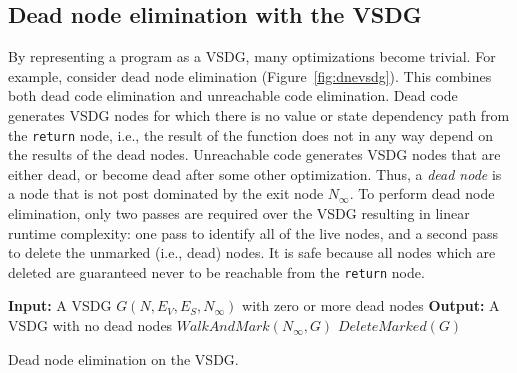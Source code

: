{\subsection{Dead node elimination with the VSDG}
By representing a program as a VSDG, many optimizations become trivial. 
For example, consider dead node elimination (Figure~\ref{fig:dnevsdg}). 
This combines both dead code elimination and unreachable code elimination. 
Dead code generates VSDG nodes for which there is no value or state dependency path from the \texttt{return} node, i.e., the result of the function does not in any way depend on the results of the dead nodes. 
Unreachable code generates VSDG nodes that are either dead, or become dead after some other optimization. 
Thus, a \textit{dead node} is a node that is not post dominated by the exit node $N_{\infty}$. 
To perform dead node elimination, only two passes are required over the VSDG resulting in linear runtime complexity: 
one pass to identify all of the live nodes, and a second pass to delete the unmarked (i.e., dead) nodes. 
It is safe because all nodes which are deleted are guaranteed never to be reachable from the \texttt{return} node.

\begin{algorithm}[!ht]
{\bf Input:} A VSDG $G(N,E_V,E_S,N_{\infty})$ with zero or more dead nodes\;
{\bf Output:} A VSDG with no dead nodes\;
$\textit{WalkAndMark}(N_{\infty},G)$\;
$\textit{DeleteMarked}(G)$\;
\vspace{1em}
\vspace{1em}
\caption{Dead node elimination on the VSDG.}
\label{fig:dnevsdg}
\end{algorithm}

}
